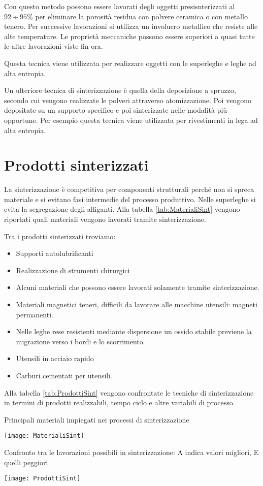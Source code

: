 Con questo metodo possono essere lavorati degli oggetti presisnterizzati al $92 \div 95\%$ per eliminare la porosità residua con polvere ceramica o con metallo tenero.
Per successive lavorazioni si utilizza un involucro metallico che resiste alle alte temperature. Le proprietà meccaniche possono essere superiori a quasi tutte le altre lavorazioni viste fin ora.

Questa tecnica viene utilizzata per realizzare oggetti con le superleghe e leghe ad alta entropia.

Un ulteriore tecnica di sinterizzazione è quella della deposizione a spruzzo, secondo cui vengono realizzate le polveri attraverso atomizzazione. Poi vengono depositate su un supporto specifico e poi sinterizzate nelle modalità più opportune.
Per esempio questa tecnica viene utilizzata per rivestimenti in lega ad alta entropia.

\section{Prodotti sinterizzati}
La sinterizzazione è competitiva per componenti strutturali perché non si spreca materiale e si evitano fasi intermedie del processo produttivo.
Nelle superleghe si evita la segregazione degli alliganti.
Alla tabella \ref{tab:MaterialiSint} vengono riportati quali materiali vengono lavorati tramite sinterizzazione.

Tra i prodotti sinterizzati troviamo:
\begin{itemize}
\item Supporti autolubrificanti
\item Realizzazione di strumenti chirurgici
\item Alcuni materiali che possono essere lavorati solamente tramite sinterizzazione.
\item Materiali magnetici teneri, difficili da lavorare alle macchine utensili: magneti permanenti.
\item Nelle leghe rese resistenti mediante dispersione un ossido stabile previene la migrazione verso i bordi e lo scorrimento.
\item Utensili in acciaio rapido
\item Carburi cementati per utensili.
\end{itemize}


Alla tabella \ref{tab:ProdottiSint} vengono confrontate le tecniche di sinterizzazione in termini di prodotti realizzabili, tempo ciclo e altre variabili di processo.
\begin{table}
\centering
\caption{Principali materiali impiegati nei processi di sinterizzazione}
\label{tab:MaterialiSint}
\texttt{[image: MaterialiSint]}
\caption{Confronto tra le lavorazioni possibili in sinterizzazione: A indica valori migliori, E quelli peggiori}
\label{tab:ProdottiSint}
\texttt{[image: ProdottiSint]}
\end{table}

